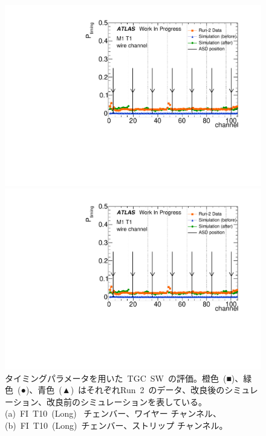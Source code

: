 \begin{figure}[H]
	\begin{minipage}{0.49\hsize}
	\centering			
	\includegraphics[width=\textwidth,page=36]{img/pdf5/master_timingplot_comp.pdf}
	\subcaption{}
	\end{minipage}
	\begin{minipage}{0.49\hsize}
	\centering
	\includegraphics[width=\textwidth,page=37]{img/pdf5/master_timingplot_comp.pdf}
	\subcaption{}
	\end{minipage}
    \caption[タイミングパラメータを用いた~TGC~SW~の評価]{タイミングパラメータを用いた~TGC~SW~の評価。橙色~(■)、緑色~(●)、青色~(▲)~はそれぞれRun~2~のデータ、改良後のシミュレーション、改良前のシミュレーションを表している。(a)~FI~T10~(Long)~ チェンバー、ワイヤー チャンネル、(b)~FI~T10~(Long)~チェンバー、ストリップ チャンネル。}
	\label{fig:timingPlotSW}
\end{figure}

